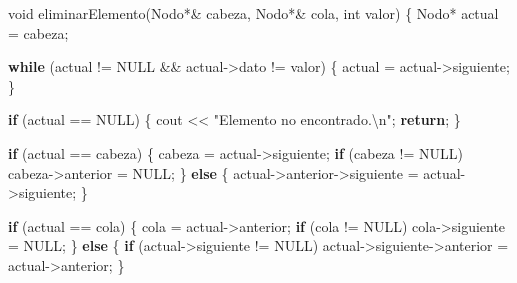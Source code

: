 \documentclass[
  11pt,
  a4paper,
  DIV=11,
  numbers=noendperiod]{scrreprt}
\newenvironment{Shaded}{\begin{snugshade}}{\end{snugshade}}
\newcommand{\ControlFlowTok}[1]{\textcolor[rgb]{0.00,0.23,0.31}{\textbf{#1}}}
\newcommand{\DataTypeTok}[1]{\textcolor[rgb]{0.68,0.00,0.00}{#1}}
\newcommand{\NormalTok}[1]{\textcolor[rgb]{0.00,0.23,0.31}{#1}}
\newcommand{\OperatorTok}[1]{\textcolor[rgb]{0.37,0.37,0.37}{#1}}
\newcommand{\SpecialCharTok}[1]{\textcolor[rgb]{0.37,0.37,0.37}{#1}}
\newcommand{\StringTok}[1]{\textcolor[rgb]{0.13,0.47,0.30}{#1}}
\begin{document}
\begin{Shaded}
\begin{Highlighting}[]
\DataTypeTok{void}\NormalTok{ eliminarElemento}\OperatorTok{(}\NormalTok{Nodo}\OperatorTok{*\&}\NormalTok{ cabeza}\OperatorTok{,}\NormalTok{ Nodo}\OperatorTok{*\&}\NormalTok{ cola}\OperatorTok{,} \DataTypeTok{int}\NormalTok{ valor}\OperatorTok{)} \OperatorTok{\{}
\NormalTok{    Nodo}\OperatorTok{*}\NormalTok{ actual }\OperatorTok{=}\NormalTok{ cabeza}\OperatorTok{;}

    \ControlFlowTok{while} \OperatorTok{(}\NormalTok{actual }\OperatorTok{!=}\NormalTok{ NULL }\OperatorTok{\&\&}\NormalTok{ actual}\OperatorTok{{-}\textgreater{}}\NormalTok{dato }\OperatorTok{!=}\NormalTok{ valor}\OperatorTok{)} \OperatorTok{\{}
\NormalTok{        actual }\OperatorTok{=}\NormalTok{ actual}\OperatorTok{{-}\textgreater{}}\NormalTok{siguiente}\OperatorTok{;}
    \OperatorTok{\}}

    \ControlFlowTok{if} \OperatorTok{(}\NormalTok{actual }\OperatorTok{==}\NormalTok{ NULL}\OperatorTok{)} \OperatorTok{\{}
\NormalTok{        cout }\OperatorTok{\textless{}\textless{}} \StringTok{"Elemento no encontrado.}\SpecialCharTok{\textbackslash{}n}\StringTok{"}\OperatorTok{;}
        \ControlFlowTok{return}\OperatorTok{;}
    \OperatorTok{\}}

    \ControlFlowTok{if} \OperatorTok{(}\NormalTok{actual }\OperatorTok{==}\NormalTok{ cabeza}\OperatorTok{)} \OperatorTok{\{}
\NormalTok{        cabeza }\OperatorTok{=}\NormalTok{ actual}\OperatorTok{{-}\textgreater{}}\NormalTok{siguiente}\OperatorTok{;}
        \ControlFlowTok{if} \OperatorTok{(}\NormalTok{cabeza }\OperatorTok{!=}\NormalTok{ NULL}\OperatorTok{)}\NormalTok{ cabeza}\OperatorTok{{-}\textgreater{}}\NormalTok{anterior }\OperatorTok{=}\NormalTok{ NULL}\OperatorTok{;}
    \OperatorTok{\}} \ControlFlowTok{else} \OperatorTok{\{}
\NormalTok{        actual}\OperatorTok{{-}\textgreater{}}\NormalTok{anterior}\OperatorTok{{-}\textgreater{}}\NormalTok{siguiente }\OperatorTok{=}\NormalTok{ actual}\OperatorTok{{-}\textgreater{}}\NormalTok{siguiente}\OperatorTok{;}
    \OperatorTok{\}}

    \ControlFlowTok{if} \OperatorTok{(}\NormalTok{actual }\OperatorTok{==}\NormalTok{ cola}\OperatorTok{)} \OperatorTok{\{}
\NormalTok{        cola }\OperatorTok{=}\NormalTok{ actual}\OperatorTok{{-}\textgreater{}}\NormalTok{anterior}\OperatorTok{;}
        \ControlFlowTok{if} \OperatorTok{(}\NormalTok{cola }\OperatorTok{!=}\NormalTok{ NULL}\OperatorTok{)}\NormalTok{ cola}\OperatorTok{{-}\textgreater{}}\NormalTok{siguiente }\OperatorTok{=}\NormalTok{ NULL}\OperatorTok{;}
    \OperatorTok{\}} \ControlFlowTok{else} \OperatorTok{\{}
        \ControlFlowTok{if} \OperatorTok{(}\NormalTok{actual}\OperatorTok{{-}\textgreater{}}\NormalTok{siguiente }\OperatorTok{!=}\NormalTok{ NULL}\OperatorTok{)}
\NormalTok{            actual}\OperatorTok{{-}\textgreater{}}\NormalTok{siguiente}\OperatorTok{{-}\textgreater{}}\NormalTok{anterior }\OperatorTok{=}\NormalTok{ actual}\OperatorTok{{-}\textgreater{}}\NormalTok{anterior}\OperatorTok{;}
    \OperatorTok{\}}


\end{Highlighting}
\end{Shaded}
\end{document}
